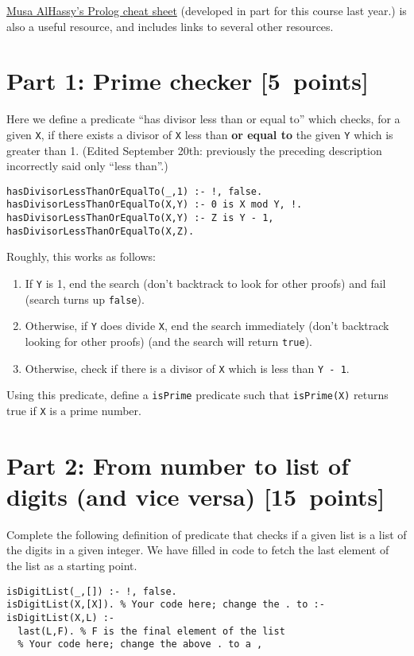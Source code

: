 \documentclass[11pt]{article}
\begin{document}
\href{https://github.com/alhassy/PrologCheatSheet}{Musa AlHassy's Prolog cheat sheet}
(developed in part for this course last year.)
is also a useful resource, and
includes links to several other resources.

\section*{Part 1: Prime checker                                  [5 points]}
\label{sec:org079e57e}
Here we define a predicate “has divisor less than or equal to”
which checks, for a given \texttt{X}, if there exists a divisor
of \texttt{X} less than \textbf{or equal to} the given \texttt{Y} which is greater than 1.
(Edited September 20th: previously the preceding description
incorrectly said only “less than”.)
\begin{verbatim}
hasDivisorLessThanOrEqualTo(_,1) :- !, false.
hasDivisorLessThanOrEqualTo(X,Y) :- 0 is X mod Y, !.
hasDivisorLessThanOrEqualTo(X,Y) :- Z is Y - 1, hasDivisorLessThanOrEqualTo(X,Z).
\end{verbatim}
Roughly, this works as follows:
\begin{enumerate}
\item If \texttt{Y} is 1, end the search (don't backtrack to look for other proofs)
and fail (search turns up \texttt{false}).
\item Otherwise, if \texttt{Y} does divide \texttt{X}, end the search immediately
(don't backtrack looking for other proofs)
(and the search will return \texttt{true}).
\item Otherwise, check if there is a divisor of \texttt{X} which is less than \texttt{Y - 1}.
\end{enumerate}

Using this predicate, define a \texttt{isPrime} predicate
such that \texttt{isPrime(X)} returns true if \texttt{X} is a prime number.

\section*{Part 2: From number to list of digits (and vice versa) [15 points]}
\label{sec:org8cc2729}
Complete the following definition of predicate that checks
if a given list is a list of the digits in a given integer.
We have filled in code to fetch the last element of the list
as a starting point.
\begin{verbatim}
isDigitList(_,[]) :- !, false.
isDigitList(X,[X]). % Your code here; change the . to :-
isDigitList(X,L) :-
  last(L,F). % F is the final element of the list
  % Your code here; change the above . to a ,
\end{verbatim}
\end{document}
